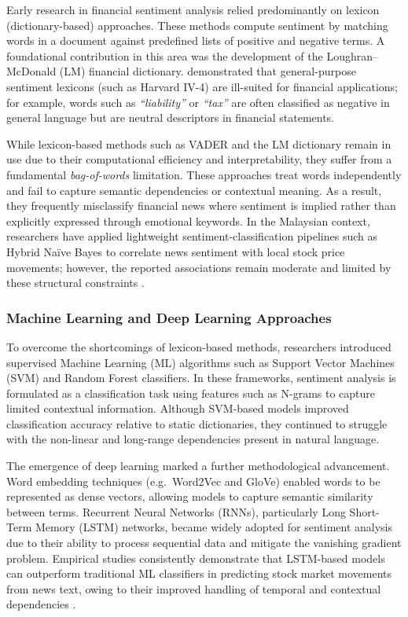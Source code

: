 \documentclass[12pt]{ucetd}
\begin{document}
Early research in financial sentiment analysis relied predominantly on lexicon (dictionary-based) approaches. These methods compute sentiment by matching words in a document against predefined lists of positive and negative terms. A foundational contribution in this area was the development of the Loughran--McDonald (LM) financial dictionary. \citet{loughran2011liability} demonstrated that general-purpose sentiment lexicons (such as Harvard IV-4) are ill-suited for financial applications; for example, words such as \emph{``liability''} or \emph{``tax''} are often classified as negative in general language but are neutral descriptors in financial statements.

While lexicon-based methods such as VADER and the LM dictionary remain in use due to their computational efficiency and interpretability, they suffer from a fundamental \emph{bag-of-words} limitation. These approaches treat words independently and fail to capture semantic dependencies or contextual meaning. As a result, they frequently misclassify financial news where sentiment is implied rather than explicitly expressed through emotional keywords. In the Malaysian context, researchers have applied lightweight sentiment-classification pipelines such as Hybrid Na\"ive Bayes to correlate news sentiment with local stock price movements; however, the reported associations remain moderate and limited by these structural constraints \cite{cheng2019malaysian}.

\subsubsection{Machine Learning and Deep Learning Approaches}

To overcome the shortcomings of lexicon-based methods, researchers introduced supervised Machine Learning (ML) algorithms such as Support Vector Machines (SVM) and Random Forest classifiers. In these frameworks, sentiment analysis is formulated as a classification task using features such as N-grams to capture limited contextual information. Although SVM-based models improved classification accuracy relative to static dictionaries, they continued to struggle with the non-linear and long-range dependencies present in natural language.

The emergence of deep learning marked a further methodological advancement. Word embedding techniques (e.g.\ Word2Vec and GloVe) enabled words to be represented as dense vectors, allowing models to capture semantic similarity between terms. Recurrent Neural Networks (RNNs), particularly Long Short-Term Memory (LSTM) networks, became widely adopted for sentiment analysis due to their ability to process sequential data and mitigate the vanishing gradient problem. Empirical studies consistently demonstrate that LSTM-based models can outperform traditional ML classifiers in predicting stock market movements from news text, owing to their improved handling of temporal and contextual dependencies \cite{ding2015deep, fischer2018deep, sidek2023bursa}.
\end{document}
